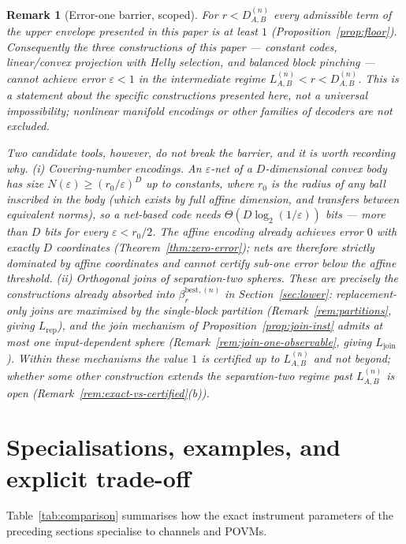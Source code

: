 \documentclass[11pt,a4paper]{article}
\newtheorem{remark}[theorem]{Remark}
\begin{document}
\begin{remark}[Error-one barrier, scoped]
\label{rem:barrier}
For $r<D_{A,B}^{(n)}$ every admissible term of the upper envelope presented in this paper is at least $1$ (Proposition~\ref{prop:floor}). Consequently the three constructions of this paper --- constant codes, linear/convex projection with Helly selection, and balanced block pinching --- cannot achieve error $\varepsilon<1$ in the intermediate regime $L_{A,B}^{(n)}<r<D_{A,B}^{(n)}$. This is a statement about the specific constructions presented here, not a universal impossibility; nonlinear manifold encodings or other families of decoders are not excluded.

Two candidate tools, however, do \emph{not} break the barrier, and it is worth recording why. (i) \emph{Covering-number encodings.} An $\varepsilon$-net of a $D$-dimensional convex body has size $N(\varepsilon)\ge(r_0/\varepsilon)^{D}$ up to constants, where $r_0$ is the radius of any ball inscribed in the body (which exists by full affine dimension, and transfers between equivalent norms), so a net-based code needs $\Theta(D\log_2(1/\varepsilon))$ bits --- more than $D$ bits for every $\varepsilon<r_0/2$. The affine encoding already achieves error $0$ with exactly $D$ coordinates (Theorem~\ref{thm:zero-error}); nets are therefore strictly dominated by affine coordinates and cannot certify sub-one error below the affine threshold. (ii) \emph{Orthogonal joins of separation-two spheres.} These are precisely the constructions already absorbed into $\beta_r^{\mathrm{best},(n)}$ in Section~\ref{sec:lower}: replacement-only joins are maximised by the single-block partition (Remark~\ref{rem:partitions}, giving $L_{\mathrm{rep}}$), and the join mechanism of Proposition~\ref{prop:join-inst} admits at most one input-dependent sphere (Remark~\ref{rem:join-one-observable}, giving $L_{\mathrm{join}}$). Within these mechanisms the value $1$ is certified up to $L_{A,B}^{(n)}$ and not beyond; whether some other construction extends the separation-two regime past $L_{A,B}^{(n)}$ is open (Remark~\ref{rem:exact-vs-certified}(b)).
\end{remark}

\section{Specialisations, examples, and explicit trade-off}
\label{sec:specialisations}

Table~\ref{tab:comparison} summarises how the exact instrument parameters of the preceding sections specialise to channels and POVMs.
\end{document}
